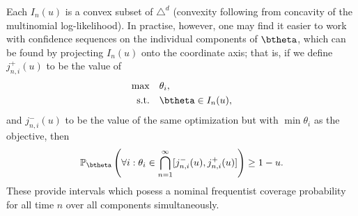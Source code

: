 \documentclass[11pt]{article}
\begin{document}
\noindent Each $I_n(u)$ is a convex subset of $\triangle^d$ (convexity following from concavity of the multinomial log-likelihood). 
In practise, however, one may find it easier to work with confidence sequences on the individual components of $\btheta$, which can be found by projecting $I_n(u)$ onto the coordinate axis; that is, if we define $j_{n,i}^+(u)$ to be the value of
\begin{align*}
  \max & \quad \theta_i, \\
  \text{s.t.} &\quad  \btheta \in I_n(u),\\
\end{align*}
and 
$j_{n,i}^-(u)$ to be the value of the same optimization but with $\min\theta_i$ as the objective, then 
\begin{equation}
  \label{eq:marginal_confidence_sequence}
  \mathbb{P}_{\btheta}\left(
    \forall i: \theta_i \in \bigcap_{n=1}^{\infty} [j_{n,i}^-(u),j_{n,i}^+(u)]
  \right) \geq 1- u.
\end{equation} 
\noindent These provide intervals which posess a nominal frequentist coverage probability for all time $n$ over all components simultaneously.
\end{document}
